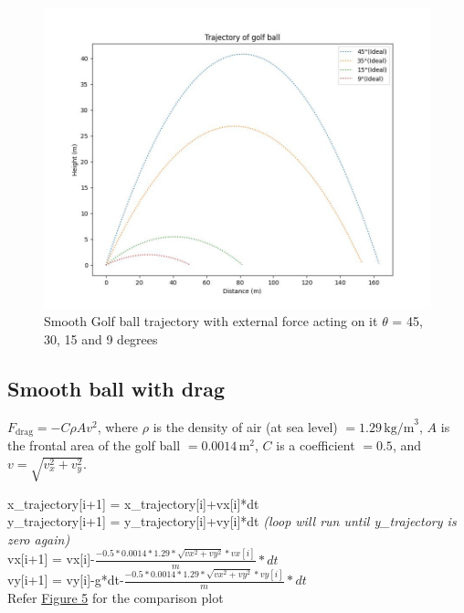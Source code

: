 \documentclass[11pt]{article}
\begin{document}
\begin{figure}[b]
    \centering
    \includegraphics[width=\textwidth, height=\textheight, keepaspectratio]{Golf_Trajectory_Ideal.jpeg}
    \caption{Smooth Golf ball trajectory with external force acting on it $\theta$ = 45, 30, 15 and 9 degrees}
    \label{fig:ideal_trajectory}
\end{figure}

\subsection{Smooth ball with drag}

\(F_{\text{drag}} = -C \rho A v^2\), 
where \(\rho\) is the density of air (at sea level) \(= 1.29 \, \text{kg/m}^3\), \(A\) is the frontal area of the golf ball \(= 0.0014 \, \text{m}^2\), \(C\) is a coefficient \(= 0.5\), and \(v = \sqrt{v_x^2 + v_y^2}\).
\begin{raggedright}
\begin{justify}
x\_trajectory[i+1] = x\_trajectory[i]+vx[i]*dt\\
y\_trajectory[i+1] = y\_trajectory[i]+vy[i]*dt \textit{(loop will run until y\_trajectory is zero again)}\\
vx[i+1] = vx[i]-$\frac{-0.5*0.0014*1.29*\sqrt{vx^2+vy^2}*vx[i]}{m}*dt$\\
vy[i+1] = vy[i]-g*dt-$\frac{-0.5*0.0014*1.29*\sqrt{vx^2+vy^2}*vy[i]}{m}*dt$\\
Refer \hyperref[fig:Smooth_Fdrag_trajectory]{Figure 5} for the comparison plot
\end{justify}
\end{raggedright}
\end{document}
